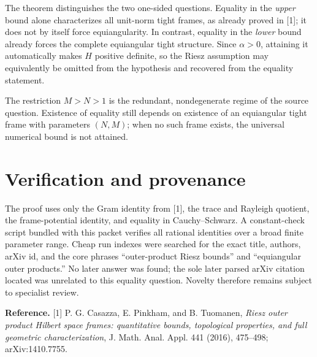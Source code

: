 \documentclass[11pt]{article}
\begin{document}
The theorem distinguishes the two one-sided questions.  Equality in the
\emph{upper} bound alone characterizes all unit-norm tight frames, as already
proved in [1]; it does not by itself force equiangularity.  In contrast,
equality in the \emph{lower} bound already forces the complete equiangular
tight structure.  Since $\alpha>0$, attaining it automatically makes $H$
positive definite, so the Riesz assumption may equivalently be omitted from
the hypothesis and recovered from the equality statement.

The restriction $M>N>1$ is the redundant, nondegenerate regime of the source
question.  Existence of equality still depends on existence of an
equiangular tight frame with parameters $(N,M)$; when no such frame exists,
the universal numerical bound is not attained.

\section{Verification and provenance}

The proof uses only the Gram identity from [1], the trace and Rayleigh
quotient, the frame-potential identity, and equality in Cauchy--Schwarz.  A
constant-check script bundled with this packet verifies all rational
identities over a broad finite parameter range.  Cheap run indexes were
searched for the exact title, authors, arXiv id, and the core phrases
``outer-product Riesz bounds'' and ``equiangular outer products.''  No later
answer was found; the sole later parsed arXiv citation located was unrelated
to this equality question.  Novelty therefore remains subject to specialist
review.

\medskip
\noindent\textbf{Reference.} [1]
P. G. Casazza, E. Pinkham, and B. Tuomanen,
\emph{Riesz outer product Hilbert space frames: quantitative bounds,
topological properties, and full geometric characterization}, J. Math. Anal.
Appl. 441 (2016), 475--498; arXiv:1410.7755.
\end{document}
